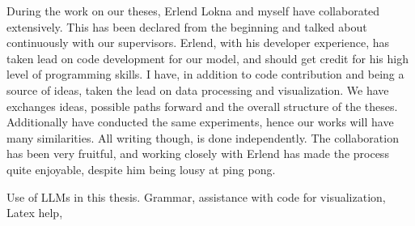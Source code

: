 \documentclass[../../thesis.tex]{subfiles}
\begin{document}
During the work on our theses, Erlend Lokna and myself have collaborated extensively. This has been declared from the beginning and talked about continuously with our supervisors. Erlend, with his developer experience, has taken lead on code development for our model, and should get credit for his high level of programming skills. I have, in addition to code contribution and being a source of ideas, taken the lead on data processing and visualization. We have exchanges ideas, possible paths forward and the overall structure of the theses. Additionally have conducted the same experiments, hence our works will have many similarities. All writing though, is done independently. The collaboration has been very fruitful, and working closely with Erlend has made the process quite enjoyable, despite him being lousy at ping pong. \newline


Use of LLMs in this thesis. Grammar, assistance with code for visualization, Latex help, 
\end{document}

